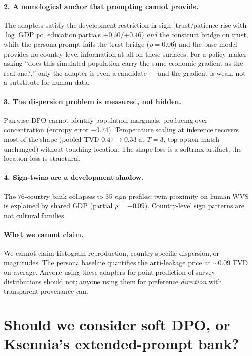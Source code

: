 \documentclass[11pt]{article}
\begin{document}
\paragraph{2. A nomological anchor that prompting cannot provide.}
The adapters satisfy the development restriction in sign (trust/patience rise with $\log$ GDP pc, education partials $+0.50$/$+0.46$) \emph{and} the construct bridge on trust, while the persona prompt fails the trust bridge ($\rho=0.06$) and the base model provides no country-level information at all on these surfaces. For a policy-maker asking ``does this simulated population carry the same economic gradient as the real one?,'' only the adapter is even a candidate --- and the gradient is weak, not a substitute for human data.

\paragraph{3. The dispersion problem is measured, not hidden.}
Pairwise DPO cannot identify population marginals, producing over-concentration (entropy error $-0.74$). Temperature scaling at inference recovers most of the shape (pooled TVD $0.47\to 0.33$ at $T{=}3$, top-option match unchanged) without touching location. The shape loss is a softmax artifact; the location loss is structural.

\paragraph{4. Sign-twins are a development shadow.}
The 76-country bank collapses to 35 sign profiles; twin proximity on human WVS is explained by shared GDP (partial $\rho=-0.09$). Country-level sign patterns are not cultural families.

\paragraph{What we cannot claim.}
We cannot claim histogram reproduction, country-specific dispersion, or magnitudes. The persona baseline quantifies the anti-leakage price at $\sim$0.09 TVD on average. Anyone using these adapters for point prediction of survey distributions should not; anyone using them for preference \emph{direction} with transparent provenance can.

\section{Should we consider soft DPO, or Ksennia's extended-prompt bank?}
\label{sec:softdpo}
\end{document}
